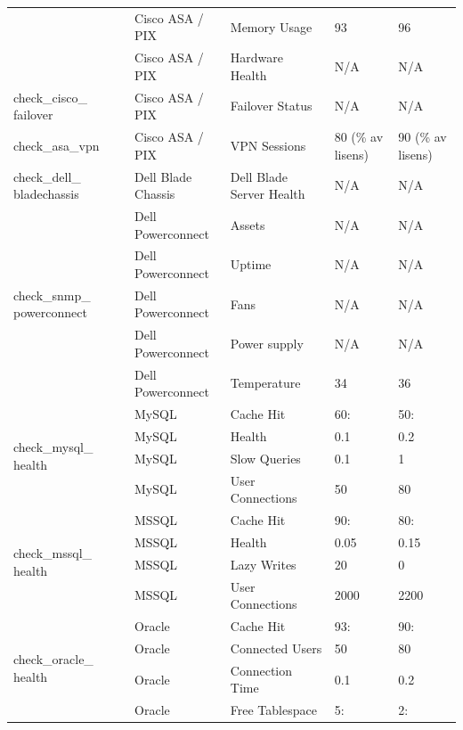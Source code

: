 \begin{table}
\begin{center}
\begin{tabular}{| p{3cm} | l | l | l | l |}
						& Cisco ASA / PIX 		& Memory Usage			& 93    & 96 \\ \cline{2-5}
						& Cisco ASA / PIX		& Hardware Health		& N/A	& N/A \\ \hline
		check\_cisco\_ failover		& Cisco ASA / PIX		& Failover Status		& N/A	& N/A \\ \hline
		check\_asa\_vpn			& Cisco ASA / PIX		& VPN Sessions		 & 80 (\% av lisens) & 90 (\% av lisens) \\ \hline
		check\_dell\_ bladechassis	& Dell Blade Chassis		& Dell Blade Server Health	& N/A	& N/A \\ \hline
		\multirow{5}{2cm}{check\_snmp\_ powerconnect} & Dell Powerconnect	& Assets			& N/A	& N/A \\ \cline{2-5}
							   & Dell Powerconnect	& Uptime			& N/A	& N/A \\ \cline{2-5}
							   & Dell Powerconnect	& Fans				& N/A	& N/A \\ \cline{2-5}
							   & Dell Powerconnect	& Power supply			& N/A	& N/A \\ \cline{2-5}
							   & Dell Powerconnect	& Temperature			& 34	& 36 \\ \hline
		\multirow{4}{2cm}{check\_mysql\_ health}      & MySQL			& Cache Hit			& 60: 	& 50: \\ \cline{2-5}
							   & MySQL			& Health			& 0.1	& 0.2 \\ \cline{2-5}
							   & MySQL			& Slow Queries			& 0.1	& 1 \\ \cline{2-5}
							   & MySQL			& User Connections		& 50	& 80 \\ \hline
		\multirow{4}{2cm}{check\_mssql\_ health}	   & MSSQL			& Cache Hit			& 90:	& 80: \\ \cline{2-5}
							   & MSSQL			& Health			& 0.05	& 0.15 \\ \cline{2-5}
							   & MSSQL			& Lazy Writes			& 20	& 0 \\ \cline{2-5}
							   & MSSQL			& User Connections		& 2000	& 2200 \\ \hline
		\multirow{4}{2cm}{check\_oracle\_ health}	   & Oracle			& Cache Hit			& 93:	& 90: \\ \cline{2-5}
							   & Oracle			& Connected Users		& 50	& 80 \\ \cline{2-5}
							   & Oracle			& Connection Time		& 0.1	& 0.2 \\ \cline{2-5}
							   & Oracle			& Free Tablespace		& 5:	& 2: \\ \hline
\end{tabular}
\label{plugins_parametere}
\end{center}
\end{table}

